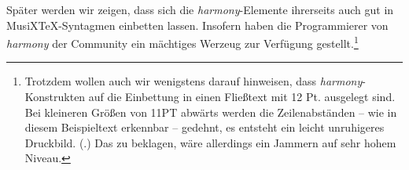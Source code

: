 Später werden wir zeigen, dass sich die \textit{harmony}-Elemente ihrerseits
auch gut in MusiX\TeX-Syntagmen einbetten lassen. Insofern haben die
Programmierer von \textit{harmony} der Community ein mächtiges Werzeug zur
Verfügung gestellt.\footnote{Trotzdem wollen auch wir wenigstens darauf
hinweisen, dass \textit{harmony}-Konstrukten auf die Einbettung in einen
Fließtext mit 12 Pt. ausgelegt sind. Bei kleineren Größen von 11PT abwärts
werden die Zeilenabständen -- wie in diesem Beispieltext erkennbar -- gedehnt,
es entsteht ein leicht unruhigeres Druckbild. (\cite[Vgl.
dazu][2]{WegWeg2007a}.) Das zu beklagen, wäre allerdings ein Jammern auf sehr
hohem Niveau.}


%

